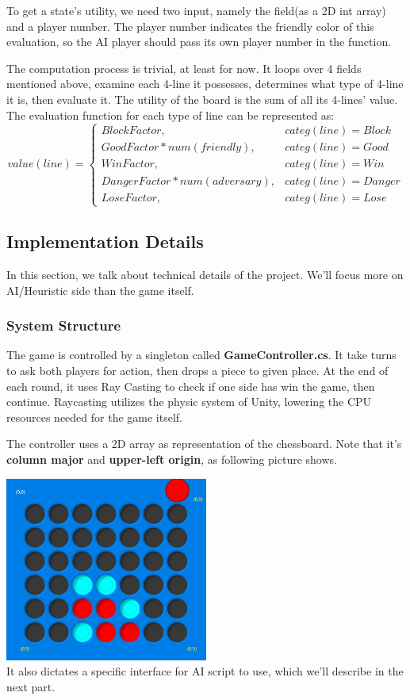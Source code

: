 \documentclass[12pt,a4paper]{article}
\begin{document}
	To get a state's utility, we need two input, namely the field(as a 2D int array) and a player number. The player number indicates the friendly color of this evaluation, so the AI player should pass its own player number in the function.
	
	The computation process is trivial, at least for now. It loops over 4 fields mentioned above, examine each 4-line it possesses, determines what type of 4-line it is, then evaluate it. The utility of the board is the sum of all its 4-lines' value.\\
	
	The evaluation function for each type of line can be represented as:
	$$value(line)=
	\begin{cases}
		BlockFactor, & categ(line) = Block\\
		GoodFactor * num(friendly), & categ(line) = Good\\
		WinFactor, & categ(line) = Win\\
		DangerFactor * num(adversary), & categ(line) = Danger\\
		LoseFactor, & categ(line) = Lose
	\end{cases}
	$$
	
	\subsection{Implementation Details}
	In this section, we talk about technical details of the project. We'll focus more on AI/Heuristic side than the game itself.
	
	\subsubsection{System Structure}
	The game is controlled by a singleton called \textbf{GameController.cs}. It take turns to ask both players for action, then drops a piece to given place. At the end of each round, it uses Ray Casting to check if one side has win the game, then continue. Raycasting utilizes the physic system of Unity, lowering the CPU resources needed for the game itself.
	
	The controller uses a 2D array as representation of the chessboard. Note that it's \textbf{column major} and \textbf{upper-left origin}, as following picture shows.
	
		{\centering\includegraphics[width=0.5\textwidth]{Majorness}~\\}
	It also dictates a specific interface for AI script to use, which we'll describe in the next part.
\end{document}
